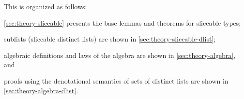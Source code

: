 \documentclass[12pt,openright,twoside,a4paper,oldfontcommands,english,brazil,final]{abntex2}
\newcommand{\listoftodos}[1]{\listoffixmes}
\theoremstyle{theo}
\begin{document}
\begin{apendicesenv}

This  is organized as follows:
\begin{alineasinline}
  \item \cref{sec:theory-sliceable} presents the base lemmas and theorems for sliceable types;
  \item sublists (sliceable distinct lists) are shown in \cref{sec:theory-sliceable-dlist};
  \item algebraic definitions and laws of the \ac{algebra} are shown in \cref{sec:theory-algebra}, and
  \item proofs using the denotational semantics of sets of distinct lists are shown in \cref{sec:theory-algebra-dlist}.
\end{alineasinline}






\end{apendicesenv}

\printindex
{}
\cleardoublepage

\end{document}
